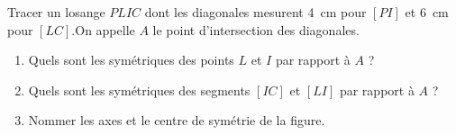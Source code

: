 
\begin{exercice}\label{exo2smath-0173}

    Tracer un losange $PLIC$ dont les diagonales mesurent \SI{4}{\centi\meter} pour $[PI]$ et \SI{6}{\centi\meter} pour $[LC]$.On appelle $A$ le point d’intersection des diagonales.                                          
    \begin{enumerate}
        \item
 Quels sont les symétriques des points $L$ et $I$ par rapport à $A$ ?
\item
 Quels sont les symétriques des segments $[IC]$ et $[LI]$ par rapport à $A$ ?
\item
 Nommer les axes et le centre de symétrie de la figure.                                               
    \end{enumerate}

\end{exercice}
